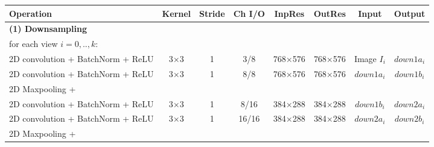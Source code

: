 \begin{table}[htbp]
\scriptsize
\centering
\begin{adjustbox}{width=1\textwidth}
\def\arraystretch{1.75}
\begin{tabular}{|l|c|c|c|c|c|c|c|}
\hline
\rowcolor{bgcolor}
\textbf{Operation}                     & \textbf{Kernel} & \textbf{Stride} & \textbf{Ch I/O} & \textbf{InpRes} & \textbf{OutRes} & \textbf{Input}     & \textbf{Output} \\ \hline
\hline
\rowcolor{bgcolor}
\textbf{(1) Downsampling}           &                 &                 &                 &                 &                 &                    &                 \\ \hline
for each view $i = 0, .., k:$            &                 &                 &                 &                 &                 &                    &                 \\ \hline
\hspace{0.75cm}2D convolution + BatchNorm + ReLU                           & 3×3             & 1               & 3/8            & 768×576         & 768×576         & Image $I_i$           & $down1a_i$          \\ \hline
\hspace{0.75cm}2D convolution + BatchNorm + ReLU                           & 3×3             & 1               & 8/8            & 768×576         & 768×576         & $down1a_i$          & $down1b_i$          \\ \hline
\hspace{0.75cm}2D Maxpooling +               &                 &                 &                 &                 &                 &                    &                 \\ 
\hspace{0.75cm}2D convolution + BatchNorm + ReLU                           & 3×3             & 1               & 8/16            & 384×288         & 384×288         & $down1b_i$           & $down2a_i$          \\ \hline
\hspace{0.75cm}2D convolution + BatchNorm + ReLU                           & 3×3             & 1               & 16/16            & 384×288         & 384×288         & $down2a_i$           & $down2b_i$         \\ \hline
\hspace{0.75cm}2D Maxpooling +               &                 &                 &                 &                 &                 &                    &                 \\ 

\end{tabular}
\end{adjustbox}
\end{table}
